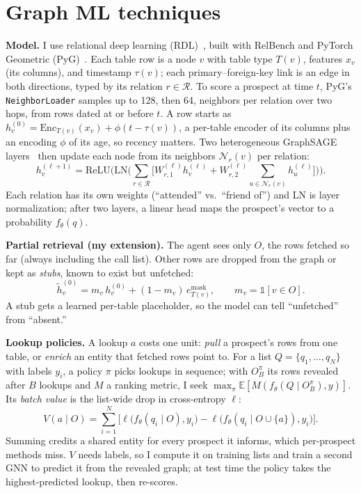 \documentclass{article}
\begin{document}
\section{Graph ML techniques}

\textbf{Model.} I use relational deep learning (RDL)~\cite{fey2024rdl}, built with RelBench and PyTorch Geometric (PyG)~\cite{fey2019pyg}. Each table row is a node $v$ with table type $T(v)$, features $x_v$ (its columns), and timestamp $\tau(v)$; each primary--foreign-key link is an edge in both directions, typed by its relation $r \in \mathcal{R}$. To score a prospect at time $t$, PyG's \texttt{NeighborLoader} samples up to 128, then 64, neighbors per relation over two hops, from rows dated at or before $t$. A row starts as $h_v^{(0)} = \mathrm{Enc}_{T(v)}(x_v) + \phi(t - \tau(v))$, a per-table encoder of its columns plus an encoding $\phi$ of its age, so recency matters. Two heterogeneous GraphSAGE layers~\cite{hamilton2017sage} then update each node from its neighbors $\mathcal{N}_r(v)$ per relation:
\begin{equation}
  h_v^{(\ell+1)} = \mathrm{ReLU}\Big(\mathrm{LN}\Big(\textstyle\sum_{r \in \mathcal{R}} \big[ W^{(\ell)}_{r,1} h_v^{(\ell)} + W^{(\ell)}_{r,2} \sum_{u \in \mathcal{N}_r(v)} h_u^{(\ell)} \big]\Big)\Big).
\end{equation}
Each relation has its own weights (``attended'' vs.\ ``friend of'') and LN is layer normalization; after two layers, a linear head maps the prospect's vector to a probability $f_\theta(q)$.

\textbf{Partial retrieval (my extension).} The agent sees only $O$, the rows fetched so far (always including the call list). Other rows are dropped from the graph or kept as \emph{stubs}, known to exist but unfetched:
\begin{equation}
  \tilde h_v^{(0)} = m_v\, h_v^{(0)} + (1 - m_v)\, e^{\mathrm{mask}}_{T(v)}, \qquad m_v = \mathds{1}[v \in O].
\end{equation}
A stub gets a learned per-table placeholder, so the model can tell ``unfetched'' from ``absent.''

\textbf{Lookup policies.} A lookup $a$ costs one unit: \emph{pull} a prospect's rows from one table, or \emph{enrich} an entity that fetched rows point to. For a list $Q = \{q_1, \dots, q_N\}$ with labels $y_i$, a policy $\pi$ picks lookups in sequence; with $O^\pi_B$ its rows revealed after $B$ lookups and $M$ a ranking metric, I seek $\max_\pi \mathbb{E}[M(f_\theta(Q \mid O^\pi_B), y)]$. Its \emph{batch value} is the list-wide drop in cross-entropy $\ell$:
\begin{equation}
  V(a \mid O) = \textstyle\sum_{i=1}^{N} \big[ \ell\big(f_\theta(q_i \mid O), y_i\big) - \ell\big(f_\theta(q_i \mid O \cup \{a\}), y_i\big) \big].
\end{equation}
Summing credits a shared entity for every prospect it informs, which per-prospect methods miss. $V$ needs labels, so I compute it on training lists and train a second GNN to predict it from the revealed graph; at test time the policy takes the highest-predicted lookup, then re-scores.
\end{document}

